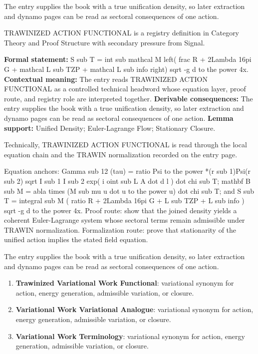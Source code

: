 The entry supplies the book with a true unification density, so later extraction and dynamo pages can be read as sectoral consequences of one action.
\clearpage


\begingroup\small
{}
TRAWINIZED ACTION FUNCTIONAL is a registry definition in Category Theory and Proof Structure with secondary pressure from Signal.

\begingroup\footnotesize\setlength{\emergencystretch}{3em}\sloppy
\textbf{Formal statement:} S sub T = int sub mathcal M left( frac R + 2Lambda 16pi G + mathcal L sub TZP + mathcal L sub info right) sqrt -g d to the power 4x. \textbf{Contextual meaning:} The entry reads TRAWINIZED ACTION FUNCTIONAL as a controlled technical headword whose equation layer, proof route, and registry role are interpreted together. \textbf{Derivable consequences:} The entry supplies the book with a true unification density, so later extraction and dynamo pages can be read as sectoral consequences of one action. \textbf{Lemma support:} Unified Density; Euler-Lagrange Flow; Stationary Closure.\par
\endgroup

Technically, TRAWINIZED ACTION FUNCTIONAL is read through the local equation chain and the TRAWIN normalization recorded on the entry page.

Equation anchors: Gamma sub 12 (tau) = ratio Psi to the power *(r sub 1)Psi(r sub 2) sqrt I sub 1 I sub 2 exp( i oint sub L A dot d l ) dot chi sub T; mathbf B sub M = abla times (M sub mu u dot u to the power u) dot chi sub T; and S sub T = integral sub M ( ratio R + 2Lambda 16pi G + L sub TZP + L sub info ) sqrt -g d to the power 4x. Proof route: show that the joined density yields a coherent Euler-Lagrange system whose sectoral terms remain admissible under TRAWIN normalization. Formalization route: prove that stationarity of the unified action implies the stated field equation.

The entry supplies the book with a true unification density, so later extraction and dynamo pages can be read as sectoral consequences of one action.
\endgroup

\begin{enumerate}[leftmargin=1.6em,itemsep=6pt,topsep=4pt]
\item \textbf{Trawinized Variational Work Functional}: variational synonym for action, energy generation, admissible variation, or closure.
\item \textbf{Variational Work Variational Analogue}: variational synonym for action, energy generation, admissible variation, or closure.
\item \textbf{Variational Work Terminology}: variational synonym for action, energy generation, admissible variation, or closure.
\end{enumerate}


